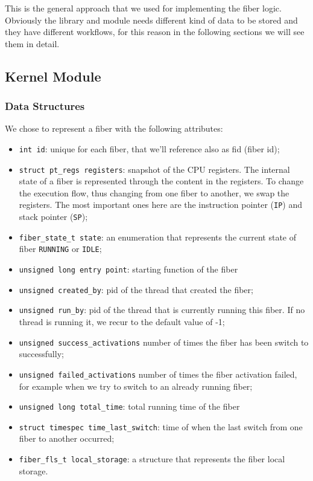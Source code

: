 \documentclass[a4paper,10pt]{article}
\begin{document}
This is the general approach that we used for implementing the fiber logic. Obviously the library and module needs different kind of data to be stored and they have different workflows, for this reason in the following sections we will see them in detail.

\subsection{Kernel Module}
\subsubsection{Data Structures}\label{subsubsec:kern-datas}
We chose to represent a fiber with the following attributes:
\begin{itemize}
	\item \lstinline{int id}: unique for each fiber, that we’ll reference also as fid (fiber id);
	\item \lstinline{struct pt_regs registers}: snapshot of the CPU registers. The internal state of a fiber is represented through the content in the registers. To change the execution flow, thus changing from one fiber to another, we swap the registers. The most important ones here are the instruction pointer (\texttt{IP}) and stack pointer (\texttt{SP});
	\item \lstinline{fiber_state_t state}: an enumeration that represents the current state of fiber \lstinline{RUNNING} or \lstinline{IDLE};
	\item \lstinline{unsigned long entry point}: starting function of the fiber
	\item \lstinline{unsigned created_by}: pid of the thread that created the fiber;
	\item \lstinline{unsigned run_by}: pid of the thread that is currently running this fiber. If no thread is running it, we recur to the default value of -1;
	\item \lstinline{unsigned success_activations} number of times the fiber has been switch to successfully;
	\item \lstinline{unsigned failed_activations} number of times the fiber activation failed, for example when we try to switch to an already running fiber;
	\item \lstinline{unsigned long total_time}: total running time of the fiber
	\item \lstinline{struct timespec time_last_switch}: time of when the last switch from one fiber to another occurred;
	\item \lstinline{fiber_fls_t local_storage}: a structure that represents the fiber local storage.
\end{itemize}
\end{document}
